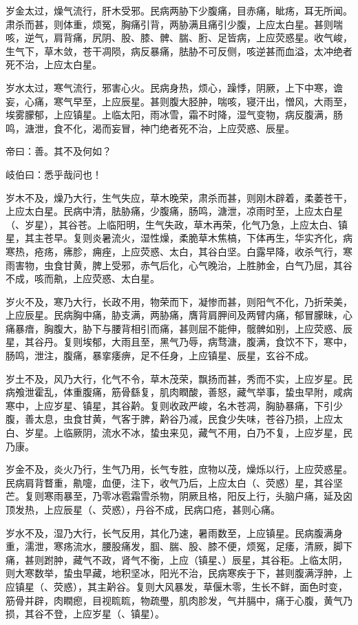\documentclass{article}%
\begin{document}
岁金太过，燥气流行，肝木受邪。民病两胁下少腹痛，目赤痛，眦疡，耳无所闻。肃杀而甚，则体重，烦冤，胸痛引背，两胁满且痛引少腹，上应太白星。甚则喘咳，逆气，肩背痛，尻阴、股、膝、髀、腨、胻、足皆病，上应荧惑星。收气峻，生气下，草木敛，苍干凋陨，病反暴痛，胠胁不可反侧，咳逆甚而血溢，太冲绝者死不治，上应太白星。

岁水太过，寒气流行，邪害心火。民病身热，烦心，躁悸，阴厥，上下中寒，谵妄，心痛，寒气早至，上应辰星。甚则腹大胫肿，喘咳，寝汗出，憎风，大雨至，埃雾朦郁，上应镇星。上临太阳，雨冰雪，霜不时降，湿气变物，病反腹满，肠鸣，溏泄，食不化，渴而妄冒，神门绝者死不治，上应荧惑、辰星。

帝曰：善。其不及何如？

岐伯曰：悉乎哉问也！

岁木不及，燥乃大行，生气失应，草木晚荣，肃杀而甚，则刚木辟着，柔萎苍干，上应太白星。民病中清，胠胁痛，少腹痛，肠鸣，溏泄，凉雨时至，上应太白星（、岁星），其谷苍。上临阳明，生气失政，草木再荣，化气乃急，上应太白、镇星，其主苍早。复则炎暑流火，湿性燥，柔脆草木焦槁，下体再生，华实齐化，病寒热，疮疡，疿胗，痈痤，上应荧惑、太白，其谷白坚。白露早降，收杀气行，寒雨害物，虫食甘黄，脾上受邪，赤气后化，心气晚治，上胜肺金，白气乃屈，其谷不成，咳而鼽，上应荧惑、太白星。

岁火不及，寒乃大行，长政不用，物荣而下，凝惨而甚，则阳气不化，乃折荣美，上应辰星。民病胸中痛，胁支满，两胁痛，膺背肩胛间及两臂内痛，郁冒朦昧，心痛暴瘖，胸腹大，胁下与腰背相引而痛，甚则屈不能伸，髋髀如别，上应荧惑、辰星，其谷丹。复则埃郁，大雨且至，黑气乃辱，病骛溏，腹满，食饮不下，寒中，肠鸣，泄注，腹痛，暴挛痿痹，足不任身，上应镇星、辰星，玄谷不成。

岁土不及，风乃大行，化气不令，草木茂荣，飘扬而甚，秀而不实，上应岁星。民病飧泄霍乱，体重腹痛，筋骨繇复，肌肉瞤酸，善怒，藏气举事，蛰虫早附，咸病寒中，上应岁星、镇星，其谷黅。复则收政严峻，名木苍凋，胸胁暴痛，下引少腹，善太息，虫食甘黄，气客于脾，黅谷乃减，民食少失味，苍谷乃损，上应太白、岁星。上临厥阴，流水不冰，蛰虫来见，藏气不用，白乃不复，上应岁星，民乃康。

岁金不及，炎火乃行，生气乃用，长气专胜，庶物以茂，燥烁以行，上应荧惑星。民病肩背瞀重，鼽嚏，血便，注下，收气乃后，上应太白（、荧惑）星，其谷坚芒。复则寒雨暴至，乃零冰雹霜雪杀物，阴厥且格，阳反上行，头脑户痛，延及囟顶发热，上应辰星（、荧惑），丹谷不成，民病口疮，甚则心痛。

岁水不及，湿乃大行，长气反用，其化乃速，暑雨数至，上应镇星。民病腹满身重，濡泄，寒疡流水，腰股痛发，腘、腨、股、膝不便，烦冤，足痿，清厥，脚下痛，甚则跗肿，藏气不政，肾气不衡，上应（镇星、）辰星，其谷秬。上临太阴，则大寒数举，蛰虫早藏，地积坚冰，阳光不治，民病寒疾于下，甚则腹满浮肿，上应镇星（、荧惑），其主黅谷。复则大风暴发，草偃木零，生长不鲜，面色时变，筋骨并辟，肉瞤瘛，目视䀮䀮，物疏璺，肌肉胗发，气并膈中，痛于心腹，黄气乃损，其谷不登，上应岁星（、镇星）。
\end{document}

